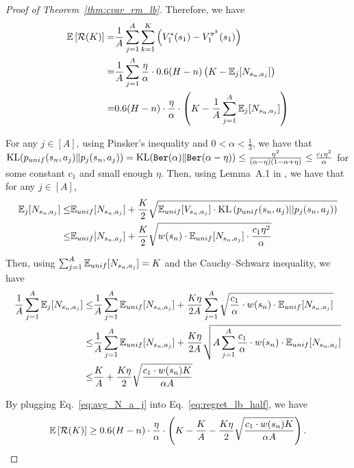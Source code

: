 \begin{proof}[Proof of Theorem~\ref{thm:cvar_rm_lb}]
{		Therefore, we have
		\begin{align}
			\mathbb{E} \left[ \mathcal{R}(K) \right] = &  \frac{1}{A} \sum_{j=1}^{A} \sum_{k=1}^{K} \left( V^{*}_1(s_1)-V^{\pi^k}_1(s_1) \right)
			\nonumber\\
			= & \frac{1}{A} \sum_{j=1}^{A} \frac{\eta}{\alpha} \cdot 0.6 (H-n) \left( K-\mathbb{E}_j[N_{s_n,a_j}]  \right) 
			\nonumber\\
			= & 0.6 (H-n) \cdot \frac{\eta}{\alpha} \cdot  \left( K-\frac{1}{A} \sum_{j=1}^{A} \mathbb{E}_j[N_{s_n,a_j}]  \right) 
			\label{eq:regret_lb_half}
		\end{align}
		
		For any $j \in [A]$, using Pinsker's inequality and $0<\alpha<\frac{1}{3}$, we have that $\textup{KL}(p_{unif}(s_n,a_j)\|p_j(s_n,a_j)) = \textup{KL}(\mathtt{Ber}(\alpha)\|\mathtt{Ber}(\alpha-\eta)) \leq \frac{\eta^2}{(\alpha-\eta) (1-\alpha+\eta)} \leq  \frac{c_1 \eta^2}{\alpha}$ for some constant $c_1$ and small enough $\eta$.
		Then, using Lemma~A.1 in \citep{auer2002nonstochastic}, we have that for any $j \in [A]$,
		\begin{align*}
			\mathbb{E}_j[N_{s_n,a_j}] \leq & \mathbb{E}_{unif}[N_{s_n,a_j}] + \frac{K}{2} \sqrt{ \mathbb{E}_{unif}[V_{s_n,a_j}] \cdot \textup{KL}\left( p_{unif}(s_n,a_j)||p_j(s_n,a_j) \right) }
			\nonumber\\
			\leq & \mathbb{E}_{unif}[N_{s_n,a_j}] + \frac{K}{2} \sqrt{ w(s_n) \cdot \mathbb{E}_{unif}[N_{s_n,a_j}] \cdot \frac{c_1 \eta^2}{\alpha} } 
		\end{align*}
		
		Then, using $\sum_{j=1}^{A} \mathbb{E}_{unif}[N_{s_n,a_j}]=K$ and the Cauchy–Schwarz inequality, we have
		\begin{align}
			\frac{1}{A} \sum_{j=1}^{A} \mathbb{E}_j[N_{s_n,a_j}] 
			\leq & \frac{1}{A} \sum_{j=1}^{A} \mathbb{E}_{unif}[N_{s_n,a_j}] +   \frac{K \eta}{2A} \sum_{j=1}^{A} \sqrt{ \frac{c_1}{\alpha} \cdot w(s_n) \cdot \mathbb{E}_{unif}[N_{s_n,a_j}] } 
			\nonumber\\
			\leq & \frac{1}{A} \sum_{j=1}^{A} \mathbb{E}_{unif}[N_{s_n,a_j}] +   \frac{K \eta}{2A} \sqrt{ A \sum_{j=1}^{A} \frac{c_1}{\alpha} \cdot w(s_n) \cdot \mathbb{E}_{unif}[N_{s_n,a_j}] } 
			\nonumber\\
			\leq & \frac{K}{A}  +  \frac{K \eta}{2} \sqrt{ \frac{ c_1 \cdot w(s_n) K}{\alpha A}  }  \label{eq:avg_N_a_j}
		\end{align}
		
		By plugging Eq.~\eqref{eq:avg_N_a_j} into Eq.~\eqref{eq:regret_lb_half}, we have
		\begin{align*}
			\mathbb{E} \left[ \mathcal{R}(K) \right] 
			\geq 0.6 (H-n) \cdot \frac{\eta}{\alpha} \cdot  \left( K - \frac{K}{A} - \frac{K \eta}{2} \sqrt{ \frac{c_1 \cdot w(s_n) K}{\alpha A}  }   \right) .
		\end{align*}
		
}
\end{proof}
